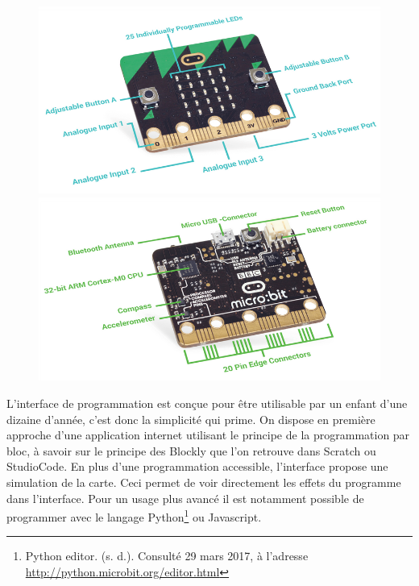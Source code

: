 \begin{figure}
    \centering
    \includegraphics[width=0.49\linewidth]{res/mb-ap-04}
    \hfill
    \includegraphics[width=0.49\linewidth]{res/mb-ap-05}
\end{figure}

L’interface de programmation est conçue pour être utilisable par un enfant d’une dizaine d’année, c’est donc la simplicité qui prime. On dispose en première approche d’une application internet utilisant le principe de la programmation par bloc, à savoir sur le principe des Blockly que l’on retrouve dans Scratch ou StudioCode. En plus d’une programmation accessible, l’interface propose une simulation de la carte. Ceci permet de voir directement les effets du programme dans l’interface. Pour un usage plus avancé il est notamment possible de programmer avec le langage Python\footnote{Python editor. (s. d.). Consulté 29 mars 2017, à l’adresse \url{http://python.microbit.org/editor.html}} ou Javascript.


